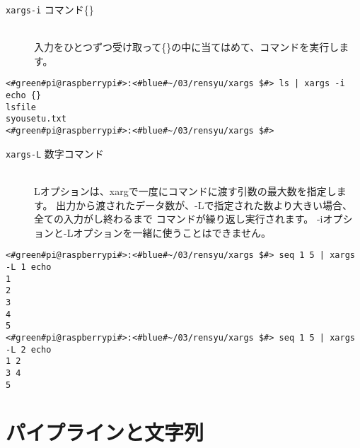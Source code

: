 \begin{description}
    \item[\texttt{xargs}\textvisiblespace \texttt{-i}\textvisiblespace
                コマンド\textvisiblespace \{\}]\mbox{}\\
    入力をひとつずつ受け取って\{\}の中に当てはめて、コマンドを実行します。
\end{description}

\begin{lstlisting}[caption=xargsコマンドのオプションi]
<#green#pi@raspberrypi#>:<#blue#~/03/rensyu/xargs $#> ls | xargs -i echo {}
lsfile
syousetu.txt
<#green#pi@raspberrypi#>:<#blue#~/03/rensyu/xargs $#>
\end{lstlisting}

\begin{description}
    \item[\texttt{xargs}\textvisiblespace \texttt{-L}\textvisiblespace
                数字\textvisiblespace コマンド]\mbox{}\\
    Lオプションは、xargで一度にコマンドに渡す引数の最大数を指定します。
    出力から渡されたデータ数が、-Lで指定された数より大きい場合、全ての入力がし終わるまで
    コマンドが繰り返し実行されます。
    -iオプションと-Lオプションを一緒に使うことはできません。
\end{description}

\begin{lstlisting}[caption=xargsコマンドのオプションL]
<#green#pi@raspberrypi#>:<#blue#~/03/rensyu/xargs $#> seq 1 5 | xargs -L 1 echo
1
2
3
4
5
<#green#pi@raspberrypi#>:<#blue#~/03/rensyu/xargs $#> seq 1 5 | xargs -L 2 echo
1 2
3 4
5
\end{lstlisting}

\begin{tcolorbox}[title=\useOmetoi]
    \begin{enumerate}
    \end{enumerate}
\end{tcolorbox}

\section{パイプラインと文字列}

